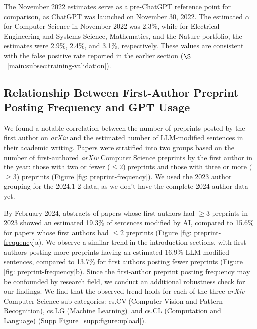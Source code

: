 \documentclass{article}
\begin{document}
The November 2022 estimates serve as a pre-ChatGPT reference point for comparison, as ChatGPT was launched on November 30, 2022. The estimated $\alpha$ for Computer Science in November 2022 was 2.3\%, while for Electrical Engineering and Systems Science, Mathematics, and the Nature portfolio, the estimates were 2.9\%, 2.4\%, and 3.1\%, respectively. These values are consistent with the false positive rate reported in the earlier section ($\S$~\ref{main:subsec:training-validation}). 







\subsection{Relationship Between First-Author Preprint Posting Frequency and GPT Usage}
\label{subsec:preprint-frequency}




We found a notable correlation between the number of preprints posted by the first author on \textit{arXiv} and the estimated number of LLM-modified sentences in their academic writing. Papers were stratified into two groups based on the number of first-authored \textit{arXiv} Computer Science preprints by the first author in the year: those with two or fewer ($\leq 2$) preprints and those with three or more ($\geq 3$) preprints (Figure \ref{fig: preprint-frequency}). We used the 2023 author grouping for the 2024.1-2 data, as we don't have the complete 2024 author data yet. 



By February 2024, abstracts of papers whose first authors had $\geq 3$ preprints in 2023 showed an estimated 19.3\% of sentences modified by AI, compared to 15.6\% for papers whose first authors had $\leq 2$ preprints (Figure \ref{fig: preprint-frequency}a). We observe a similar trend in the introduction sections, with first authors posting more preprints having an estimated 16.9\% LLM-modified sentences, compared to 13.7\% for first authors posting fewer preprints (Figure \ref{fig: preprint-frequency}b).
Since the first-author preprint posting frequency may be confounded by research field, we conduct an additional robustness check for our findings. We find that the observed trend holds for each of the three \textit{arXiv} Computer Science sub-categories: cs.CV (Computer Vision and Pattern Recognition), cs.LG (Machine Learning), and cs.CL (Computation and Language) (Supp Figure~\ref{supp:figure:upload}).
\end{document}

